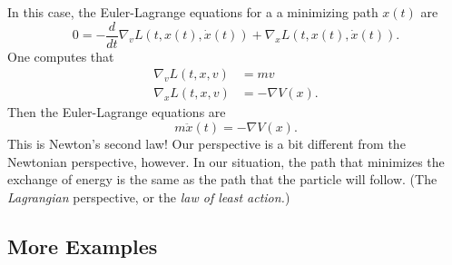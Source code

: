 \documentclass[11pt]{article}
\begin{document}
In this case, the Euler-Lagrange equations for a a minimizing path $x(t)$ are
\[
0 = -\frac{d}{dt} \nabla_v L(t, x(t), \dot{x}(t)) + \nabla_x L(t, x(t), \dot{x}(t)).
\]
One computes that 
\begin{align*}
\nabla_v L(t,x,v) &= mv \\
\nabla_x L(t,x,v) &= -\nabla V(x).
\end{align*}
Then the Euler-Lagrange equations are
\[
\boxed{m \ddot{x}(t) = -\nabla V(x).}
\]
This is Newton's second law! Our perspective is a bit different from the Newtonian perspective, however. In our situation, the path that minimizes the exchange of energy is the same as the path that the particle will follow. (The \emph{Lagrangian} perspective, or the \emph{law of least action.})

\subsection{More Examples}
\end{document}
